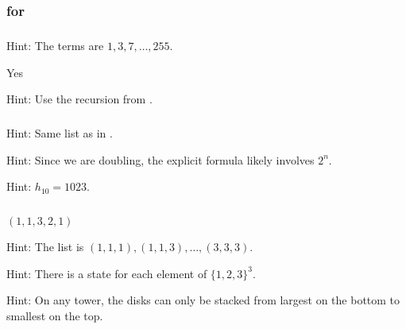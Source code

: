 \subsection{\answers}

\subsubsection{\answers for 
 \subhanoi}

\subsubsection*{ \answers}
\begin{apart}
    \item Hint: The terms are $1, 3, 7, \ldots, 255$.
    \item Yes
    \item Hint: Use the recursion from .
\end{apart}

\subsubsection*{ \answers}
\begin{apart}
    \item Hint: Same list as in .
    \item Hint: Since we are doubling, the explicit formula likely involves $2^n$.
    \item Hint: $h_{10} = 1023$.
\end{apart}

\subsubsection*{ \answers}
\begin{apart}
    \item $(1,1,3,2,1)$
    \item Hint: The list is $(1,1,1), (1,1,3), \ldots, (3,3,3)$.
    \item Hint: There is a state for each element of $\{1,2,3\}^3$.
    \item Hint: On any tower, the disks can only be stacked from largest on the bottom to smallest on the top. 
\end{apart}

